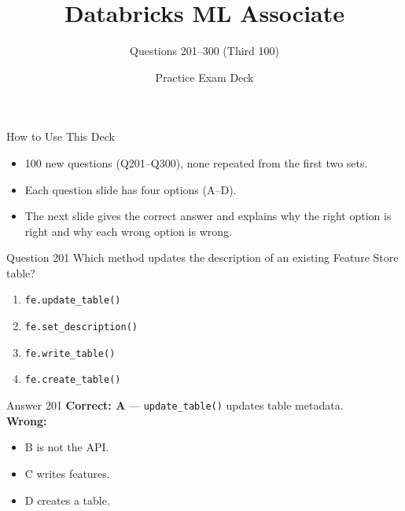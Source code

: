 \documentclass[aspectratio=169,11pt]{beamer}
\title{Databricks ML Associate}
\subtitle{Questions 201--300 (Third 100)}
\author{Practice Exam Deck}
\date{}
\begin{document}
	
	\begin{frame}
		\titlepage
	\end{frame}
	
	\begin{frame}{How to Use This Deck}
		\begin{itemize}
			\item 100 new questions (Q201--Q300), none repeated from the first two sets.
			\item Each question slide has four options (A--D).
			\item The next slide gives the correct answer and explains why the right option is right and why each wrong option is wrong.
		\end{itemize}
	\end{frame}
	
	\begin{frame}{Question 201}
		Which method updates the description of an existing Feature Store table?
		\begin{enumerate}[label=\Alph*.]
			\item \texttt{fe.update\_table()}
			\item \texttt{fe.set\_description()}
			\item \texttt{fe.write\_table()}
			\item \texttt{fe.create\_table()}
		\end{enumerate}
	\end{frame}
	\begin{frame}{Answer 201}
		\textbf{Correct: A} --- \texttt{update\_table()} updates table metadata.\\
		\vspace{0.5em}
		\textbf{Wrong:}
		\begin{itemize}
			\item B is not the API.
			\item C writes features.
			\item D creates a table.
		\end{itemize}
	\end{frame}
	
\end{document}
